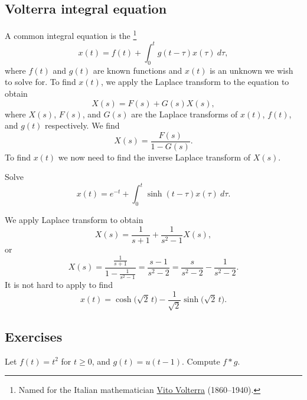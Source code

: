 \subsection{Volterra integral equation}

A common integral equation
is the \emph{}%
\footnote{Named for the Italian mathematician
\href{https://en.wikipedia.org/wiki/Vito_Volterra}{Vito Volterra}
(1860--1940).}
\begin{equation*}
x(t) = f(t) + \int_0^t g(t-\tau) x(\tau) ~ d\tau ,
\end{equation*}
where $f(t)$ and $g(t)$ are known functions and $x(t)$ is an unknown we
wish to solve for.
To find $x(t)$,
we apply the Laplace transform to the equation to obtain 
\begin{equation*}
X(s) = F(s) + G(s) X(s) ,
\end{equation*}
where $X(s)$, $F(s)$, and $G(s)$ are the Laplace transforms of $x(t)$, $f(t)$, and
$g(t)$ respectively.  We find
\begin{equation*}
X(s) = \frac{F(s)}{1-G(s)} .
\end{equation*}
To find $x(t)$ we now need to find the 
inverse Laplace transform of $X(s)$.

\begin{example}
Solve
\begin{equation*}
x(t) =  e^{-t} + \int_0^t \sinh(t-\tau) x(\tau) ~ d\tau .
\end{equation*}

We apply Laplace transform to obtain
\begin{equation*}
X(s) = \frac{1}{s+1} + \frac{1}{s^2-1} X(s) ,
\end{equation*}
or
\begin{equation*}
X(s) = \frac{\frac{1}{s+1}}{1- \frac{1}{s^2-1}}
=
\frac{s-1}{s^2 - 2}
=
\frac{s}{s^2 - 2}
-
\frac{1}{s^2 - 2} .
\end{equation*}
It is not hard to apply  to find
\begin{equation*}
x(t) = \cosh \bigl( \sqrt{2} \, t \bigr) -
\frac{1}{\sqrt{2}} \sinh \bigl( \sqrt{2}\, t \bigr).
\end{equation*}
\end{example}

\subsection{Exercises}

\begin{exercise}
Let $f(t) = t^2$ for $t \geq 0$, and $g(t) = u(t-1)$.  Compute
$f * g$.
\end{exercise}

